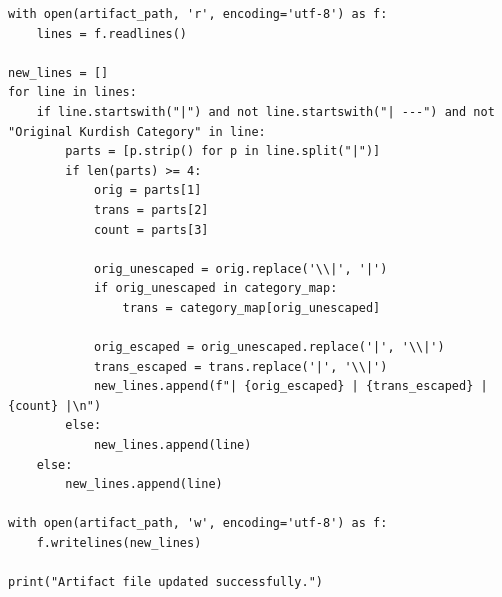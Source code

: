\documentclass[11pt]{article}
\begin{document}
\begin{lstlisting}[style=pythoncode, caption={update\_artifact.py}]
with open(artifact_path, 'r', encoding='utf-8') as f:
    lines = f.readlines()

new_lines = []
for line in lines:
    if line.startswith("|") and not line.startswith("| ---") and not "Original Kurdish Category" in line:
        parts = [p.strip() for p in line.split("|")]
        if len(parts) >= 4:
            orig = parts[1]
            trans = parts[2]
            count = parts[3]
            
            orig_unescaped = orig.replace('\\|', '|')
            if orig_unescaped in category_map:
                trans = category_map[orig_unescaped]
            
            orig_escaped = orig_unescaped.replace('|', '\\|')
            trans_escaped = trans.replace('|', '\\|')
            new_lines.append(f"| {orig_escaped} | {trans_escaped} | {count} |\n")
        else:
            new_lines.append(line)
    else:
        new_lines.append(line)

with open(artifact_path, 'w', encoding='utf-8') as f:
    f.writelines(new_lines)

print("Artifact file updated successfully.")
\end{lstlisting}
\end{document}
